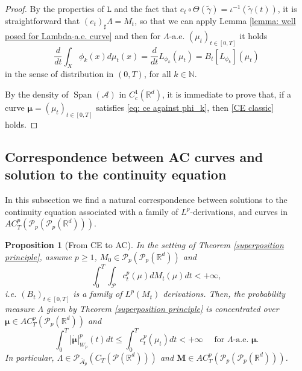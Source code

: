 \documentclass[10pt,leqno]{amsart}
\numberwithin{equation}{section}
\newtheorem{prop}[teorema]{Proposition}
\newcommand{\R}{\mathbb{R}}
\newcommand{\N}{\mathbb{N}}
\newcommand{\PP}{\mathcal{P}}
\begin{document}
\begin{proof}
    By the properties of $\mathtt{L}$ and the fact that $e_t\circ \Theta (\tilde{\gamma})= \iota^{-1} (\tilde{\gamma}(t))$, it is straightforward that $(e_t)_\sharp \Lambda = M_t$, so that we can apply Lemma \ref{lemma: well posed for Lambda-a.e. curve} and then for $\Lambda$-a.e. $(\mu_t)_{t\in [0,T]}$ it holds
    \begin{equation}\label{eq: ce against phi_k}
    \frac{d}{dt}\int_X \phi_k(x) d\mu_t(x) = \frac{d}{dt}L_{\phi_k}(\mu_t) = B_t[L_{\phi_k}](\mu_t)\end{equation}
    in the sense of distribution in $(0,T)$, for all $k\in \N$. 
    
   By the density of $\operatorname{Span}(\mathcal{A})$ in $C_c^1(\R^d)$, it is immediate to prove that, if a curve $\boldsymbol{\mu} = (\mu_t)_{t\in[0,T]}$ satisfies \eqref{eq: ce against phi_k}, then \eqref{CE classic} holds. 
\end{proof}



\subsection{Correspondence between AC curves and solution to the continuity equation}\label{subsec: corr AC with CERM}

In this subsection we find a natural correspondence between solutions to the continuity equation associated with a family of $L^p$-derivations, and curves in $AC_T^p(\PP_p(\PP_p(\R^d)))$.



\begin{prop}[From CE to AC]\label{p-superposition}
    In the setting of Theorem \ref{superposition principle}, assume $p\geq 1$, $M_0 \in \PP_p(\PP_p(\R^d))$ and  
    \begin{equation}
        \int_0^T \int_\PP c_t^p(\mu) dM_t(\mu) dt <+\infty,
    \end{equation}
    i.e. $(B_t)_{t\in [0,T]}$ is a family of $L^p(M_t)$ derivations.
    Then, the probability measure $\Lambda$ given by Theorem \ref{superposition principle} is concentrated over $\boldsymbol{\mu}\in AC_T^p(\PP_p(\R^d))$ and
    \begin{equation}\label{eq: energy ineq derivations}
        \int_0^T |\dot{\boldsymbol{\mu}}|_{W_p}^p(t) dt  \leq \int_0^T c_t^p(\mu_t) dt <+\infty \quad \text{ for }\Lambda\text{-a.e. } \boldsymbol{\mu}.
    \end{equation}
    In particular, $\Lambda \in \PP_{\bar{\mathcal{A}}_p}(C_T(\PP(\R^d)))$ and $\boldsymbol{M} \in AC_T^p(\PP_p(\PP_p(\R^d)))$.
\end{prop}
\end{document}
